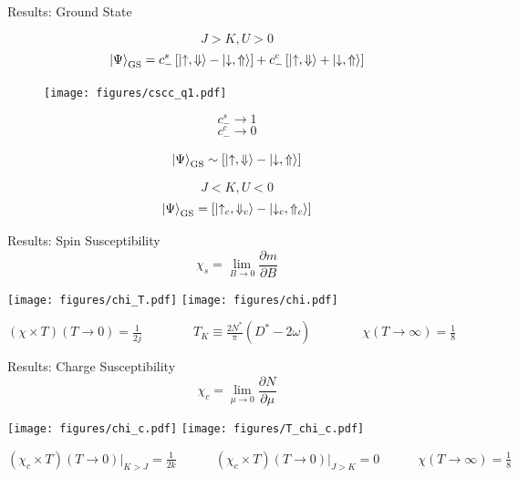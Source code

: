 \documentclass[aspectratio=169]{beamer}
\begin{document}
\begin{frame}{Results: Ground State}
\begin{minipage}{0.65\textwidth}
	\[J > K, U>0\]
\vspace*{-10pt}
	\[\ket{\Psi}_\text{GS} = c_-^s\left[\ket{\uparrow, \Downarrow} - \ket{\downarrow, \Uparrow}\right] + c_-^c\left[\ket{\uparrow, \Downarrow} + \ket{\downarrow, \Uparrow}\right]\]

\vspace*{10pt}
\begin{minipage}{0.65\textwidth}
\begin{figure}[htpb]
	\centering
	\texttt{[image: figures/cscc\_q1.pdf]}
\end{figure}
\end{minipage}
\begin{minipage}{0.3\textwidth}
	\[ c_-^s \to 1\]
	\[ c_-^c \to 0\]
\end{minipage}
\[\ket{\Psi}_\text{GS} \sim \left[\ket{\uparrow, \Downarrow} - \ket{\downarrow, \Uparrow}\right]\]
\end{minipage}
\vline
\begin{minipage}{0.34\textwidth}
\[J < K, U<0\]
\[\ket{\Psi}_\text{GS} = \left[\ket{\uparrow_c, \Downarrow_c} - \ket{\downarrow_c, \Uparrow_c}\right]\]
\vspace*{0.6\textheight}
\end{minipage}
\end{frame}

\begin{frame}{Results: Spin Susceptibility}
	\vspace*{-20pt}
	\[\chi_s = \lim_{B \to 0} \frac{\partial{m}}{\partial{B}}\]
\begin{center}
	\hspace*{-20pt}
	\texttt{[image: figures/chi\_T.pdf]}
	\hspace*{25pt}
	\texttt{[image: figures/chi.pdf]}
\end{center}
\hspace*{20pt}\large{\(
\left(\chi\times T\right)\left( T \to 0 \right) = \frac{1}{2j} \quad\quad \quad \quad T_K \equiv \frac{2N^*}{\pi}\left(D^* - 2\omega\right)\quad\quad \quad \quad \chi \left( T \to \infty \right) = \frac{1}{8}\)}


\end{frame}

\begin{frame}{Results: Charge Susceptibility}
	\vspace*{-15pt}
	\[\chi_c = \lim_{\mu \to 0} \frac{\partial{N}}{\partial{\mu}}\]
\begin{center}
	\hspace*{-20pt}
	\texttt{[image: figures/chi\_c.pdf]}
	\hspace*{25pt}
	\texttt{[image: figures/T\_chi\_c.pdf]}
\end{center}
\large{\(
\left(\chi_c\times T\right)\left(T \to 0\right)\big\vert_{K>J} = \frac{1}{2k} \quad\quad\quad \left(\chi_c\times T\right)\left(T \to 0\right)\big\vert_{J>K} = 0 \quad\quad\quad \chi \left( T \to \infty \right) = \frac{1}{8}\)}
\end{frame}
\end{document}
